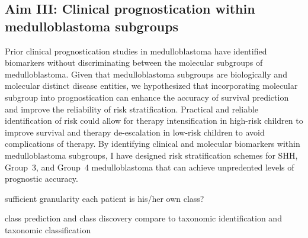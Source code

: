 \subsection*{Aim III: Clinical prognostication within medulloblastoma subgroups}

Prior clinical prognostication studies in medulloblastoma have identified biomarkers without discriminating between the molecular subgroups of medulloblastoma. Given that medulloblastoma subgroups are biologically and molecular distinct disease entities, we hypothesized that incorporating molecular subgroup into prognostication can enhance the accuracy of survival prediction and improve the reliability of risk stratification. Practical and reliable identification of risk could allow for therapy intensification in high-risk children to improve survival and therapy de-escalation in low-risk children to avoid complications of therapy. By identifying clinical and molecular biomarkers within medulloblastoma subgroups, I have designed risk stratification schemes for SHH, Group~3, and Group~4 medulloblastoma that can achieve unpredented levels of prognostic accuracy.


sufficient granularity
each patient is his/her own class?

class prediction and class discovery
compare to taxonomic identification and taxonomic classification

